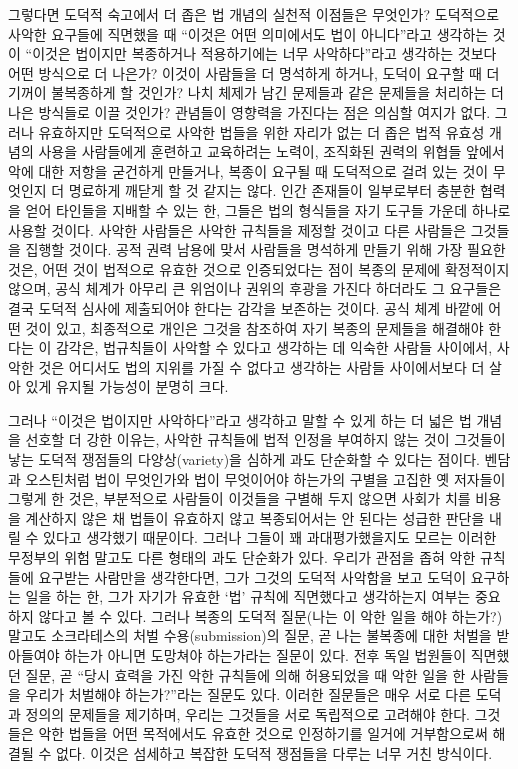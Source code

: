 그렇다면 도덕적 숙고에서 더 좁은 법 개념의 실천적 이점들은 무엇인가?
도덕적으로 사악한 요구들에 직면했을 때 “이것은 어떤 의미에서도 법이
아니다”라고 생각하는 것이 “이것은 법이지만 복종하거나 적용하기에는
너무 사악하다”라고 생각하는 것보다 어떤 방식으로 더 나은가? 이것이
사람들을 더 명석하게 하거나, 도덕이 요구할 때 더 기꺼이 불복종하게 할
것인가? 나치 체제가 남긴 문제들과 같은 문제들을 처리하는 더 나은
방식들로 이끌 것인가? 관념들이 영향력을 가진다는 점은 의심할 여지가
없다. 그러나 유효하지만 도덕적으로 사악한 법들을 위한 자리가 없는 더
좁은 법적 유효성 개념의 사용을 사람들에게 훈련하고 교육하려는 노력이,
조직화된 권력의 위협들 앞에서 악에 대한 저항을 굳건하게 만들거나, 복종이
요구될 때 도덕적으로 걸려 있는 것이 무엇인지 더 명료하게 깨닫게 할 것
같지는 않다. 인간 존재들이 일부로부터 충분한 협력을 얻어 타인들을 지배할
수 있는 한, 그들은 법의 형식들을 자기 도구들 가운데 하나로 사용할
것이다. 사악한 사람들은 사악한 규칙들을 제정할 것이고 다른 사람들은
그것들을 집행할 것이다. 공적 권력 남용에 맞서 사람들을 명석하게 만들기
위해 가장 필요한 것은, 어떤 것이 법적으로 유효한 것으로 인증되었다는
점이 복종의 문제에 확정적이지 않으며, 공식 체계가 아무리 큰 위엄이나
권위의 후광을 가진다 하더라도 그 요구들은 결국 도덕적 심사에 제출되어야
한다는 감각을 보존하는 것이다. 공식 체계 바깥에 어떤 것이 있고,
최종적으로 개인은 그것을 참조하여 자기 복종의 문제들을 해결해야 한다는
이 감각은, 법규칙들이 사악할 수 있다고 생각하는 데 익숙한 사람들
사이에서, 사악한 것은 어디서도 법의 지위를 가질 수 없다고 생각하는
사람들 사이에서보다 더 살아 있게 유지될 가능성이 분명히 크다.

그러나 “이것은 법이지만 사악하다”라고 생각하고 말할 수 있게 하는 더
넓은 법 개념을 선호할 더 강한 이유는, 사악한 규칙들에 법적 인정을
부여하지 않는 것이 그것들이 낳는 도덕적 쟁점들의 다양상(variety)을
심하게 과도 단순화할 수 있다는 점이다. 벤담과 오스틴처럼 법이 무엇인가와
법이 무엇이어야 하는가의 구별을 고집한 옛 저자들이 그렇게 한 것은,
부분적으로 사람들이 이것들을 구별해 두지 않으면 사회가 치를 비용을
계산하지 않은 채 법들이 유효하지 않고 복종되어서는 안 된다는 성급한
판단을 내릴 수 있다고 생각했기 때문이다. 그러나 그들이 꽤
과대평가했을지도 모르는 이러한 무정부의 위험 말고도 다른 형태의 과도
단순화가 있다. 우리가 관점을 좁혀 악한 규칙들에 
요구받는 사람만을 생각한다면, 그가 그것의 도덕적 사악함을 보고 도덕이
요구하는 일을 하는 한, 그가 자기가 유효한 ‘법’ 규칙에 직면했다고
생각하는지 여부는 중요하지 않다고 볼 수 있다. 그러나 복종의 도덕적
질문(나는 이 악한 일을 해야 하는가?) 말고도 소크라테스의 처벌
수용(submission)의 질문, 곧 나는 불복종에 대한 처벌을 받아들여야 하는가
아니면 도망쳐야 하는가라는 질문이 있다. 전후 독일 법원들이 직면했던
질문, 곧 “당시 효력을 가진 악한 규칙들에 의해 허용되었을 때 악한 일을
한 사람들을 우리가 처벌해야 하는가?”라는 질문도 있다. 이러한 질문들은
매우 서로 다른 도덕과 정의의 문제들을 제기하며, 우리는 그것들을 서로
독립적으로 고려해야 한다. 그것들은 악한 법들을 어떤 목적에서도 유효한
것으로 인정하기를 일거에 거부함으로써 해결될 수 없다. 이것은 섬세하고
복잡한 도덕적 쟁점들을 다루는 너무 거친 방식이다.

